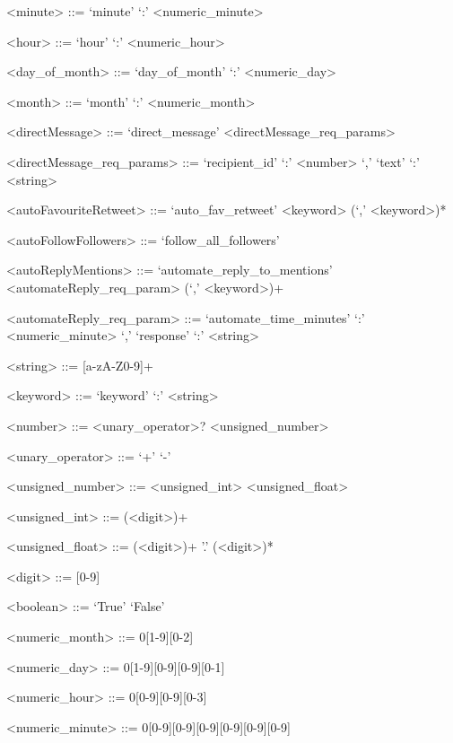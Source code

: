 \begin{appendices}
\begin{grammar}
<minute> ::= `minute' `:' <numeric_minute>

<hour> ::= `hour' `:' <numeric_hour>

<day_of_month> ::= `day_of_month' `:' <numeric_day>

<month> ::= `month' `:' <numeric_month>

<directMessage> ::= `direct_message' <directMessage_req_params>

<directMessage_req_params> ::= `recipient_id' `:' <number> `,' `text' `:' <string>

<autoFavouriteRetweet> ::= `auto_fav_retweet' <keyword> (`,' <keyword>)* 

<autoFollowFollowers> ::= `follow_all_followers'

<autoReplyMentions> ::= `automate_reply_to_mentions' \newline <automateReply_req_param> (`,' <keyword>)+

<automateReply_req_param> ::= `automate_time_minutes' `:' <numeric_minute> `,' \newline `response' `:' <string>

<string> ::= [a-zA-Z0-9]+

<keyword> ::= `keyword' `:' <string>

<number> ::= <unary_operator>? <unsigned_number>

<unary_operator> ::= `+' \alt `-'

<unsigned_number> ::= <unsigned_int>
\alt <unsigned_float>

<unsigned_int> ::= (<digit>)+

<unsigned_float> ::= (<digit>)+ '.' (<digit>)*

<digit> ::= [0-9]

<boolean> ::= `True'
\alt `False'

<numeric_month> ::= 0[1-9][0-2]

<numeric_day> ::= 0[1-9][0-9][0-9][0-1]

<numeric_hour> ::= 0[0-9][0-9][0-3]

<numeric_minute> ::= 0[0-9][0-9][0-9][0-9][0-9][0-9]

\end{grammar}

\end{appendices}